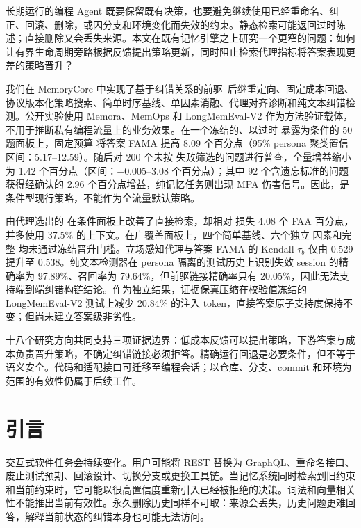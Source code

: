 \begin{paperabstract}
长期运行的编程 Agent 既要保留既有决策，也要避免继续使用已经重命名、纠正、回滚、删除，或因分支和环境变化而失效的约束。静态检索可能返回过时陈述；直接删除又会丢失来源。本文在既有记忆引擎之上研究一个更窄的问题：如何让有界生命周期旁路根据反馈提出策略更新，同时阻止检索代理指标将答案表现更差的策略晋升？

我们在 MemoryCore 中实现了基于纠错关系的前驱--后继重定向、固定成本回退、协议版本化策略搜索、简单时序基线、单因素消融、代理对齐诊断和纯文本纠错检测。公开实验使用 Memora、MemOps 和 LongMemEval-V2 作为方法验证载体，不用于推断私有编程流量上的业务效果。在一个冻结的、以过时 \base 暴露为条件的 50 题面板上，固定预算 \vone 将答案 FAMA 提高 8.09 个百分点（95\% persona 聚类置信区间：5.17--12.59）。随后对 200 个未按 \base 失败筛选的问题进行普查，全量增益缩小为 1.42 个百分点（区间：$-0.005$--3.08 个百分点）；其中 92 个含遗忘标准的问题获得经确认的 2.96 个百分点增益，纯记忆任务则出现 MPA 伤害信号。因此，\vone 是条件型现行策略，不能作为全流量默认策略。

由代理选出的 \vtwo 在条件面板上改善了直接检索，却相对 \vone 损失 4.08 个 FAA 百分点，并多使用 37.5\% 的上下文。在广覆盖面板上，四个简单基线、六个独立 \vtwo 因素和完整 \vtwo 均未通过冻结晋升门槛。立场感知代理与答案 FAMA 的 Kendall $\tau_b$ 仅由 0.529 提升至 0.538。纯文本检测器在 persona 隔离的测试历史上识别失效 session 的精确率为 97.89\%、召回率为 79.64\%，但前驱链接精确率只有 20.05\%，因此无法支持端到端纠错构链结论。作为独立结果，证据保真压缩在校验值冻结的 LongMemEval-V2 测试上减少 20.84\% 的注入 token，直接答案原子支持度保持不变；但尚未建立答案级非劣性。

十八个研究方向共同支持三项证据边界：低成本反馈可以提出策略，下游答案与成本负责晋升策略，不确定纠错链接必须拒答。精确运行回退是必要条件，但不等于语义安全。代码和适配接口可迁移至编程会话；以仓库、分支、commit 和环境为范围的有效性仍属于后续工作。
\end{paperabstract}

\clearpage
\begingroup
\small
\tableofcontents
\endgroup
\clearpage

\section{引言}

交互式软件任务会持续变化。用户可能将 REST 替换为 GraphQL、重命名接口、废止测试预期、回滚设计、切换分支或更换工具链。当记忆系统同时检索到旧约束和当前约束时，它可能以很高置信度重新引入已经被拒绝的决策。词法和向量相关性不能推出当前有效性。永久删除历史同样不可取：来源会丢失，历史问题更难回答，解释当前状态的纠错本身也可能无法访问。


